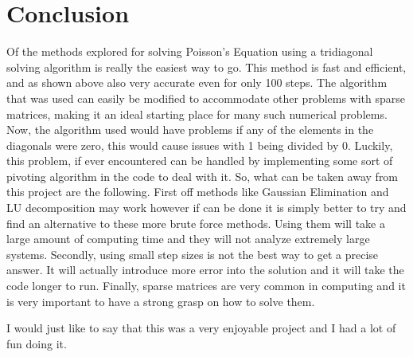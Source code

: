 \documentclass[12pt,righttag]{article}
\begin{document}
\section{Conclusion}
	Of the methods explored for solving Poisson's Equation using a tridiagonal solving algorithm is really the easiest way to go. This method is fast and efficient, and as shown above also very accurate even for only 100 steps. The algorithm that was used can easily be modified to accommodate other problems with sparse matrices, making it an ideal starting place for many such numerical problems. Now, the algorithm used would have problems if any of the elements in the diagonals were zero, this would cause issues with 1 being divided by 0. Luckily, this problem, if ever encountered can be handled by implementing some sort of pivoting algorithm in the code to deal with it. So, what can be taken away from this project are the following. First off methods like Gaussian Elimination and LU decomposition may work however if can be done it is simply better to try and find an alternative to these more brute force methods. Using them will take a large amount of computing time and they will not analyze extremely large systems. Secondly, using small step sizes is not the best way to get a precise answer. It will actually introduce more error into the solution and it will take the code longer to run. Finally, sparse matrices are very common in computing and it is very important to have a strong grasp on how to solve them.
	
	I would just like to say that this was a very enjoyable project and I had a lot of fun doing it.
	
\end{document}
